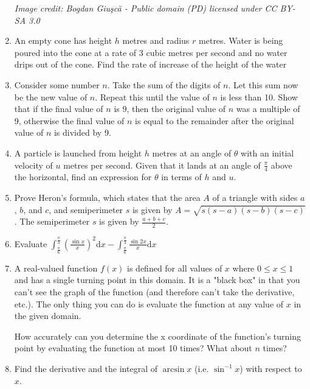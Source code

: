 \documentclass{article}
\begin{document}
\begin{enumerate}
    \textit{Image credit: Bogdan Giuşcă - Public domain (PD) licensed under CC BY-SA 3.0}
    
    \item
    An empty cone has height $h$ metres and radius $r$ metres. Water is being poured into the cone at a rate of 3 cubic metres per second and no water drips out of the cone. Find the rate of increase of the height of the water

    \item
    Consider some number $n$. Take the sum of the digits of $n$. Let this sum now be the new value of $n$. Repeat this until the value of $n$ is less than 10. Show that if the final value of $n$ is 9, then the original value of $n$ was a multiple of 9, otherwise the final value of $n$ is equal to the remainder after the original value of $n$ is divided by 9.
    
    \item
    A particle is launched from height $h$ metres at an angle of $\theta$ with an initial velocity of $u$ metres per second. Given that it lands at an angle of $\frac{\pi}{4}$ above the horizontal, find an expression for $\theta$ in terms of $h$ and $u$.
    
    \item
    Prove Heron's formula, which states that the area $A$ of a triangle with sides $a$, $b$, and $c$, and semiperimeter $s$ is given by $A = \sqrt{s(s-a)(s-b)(s-c)}$. The semiperimeter $s$ is given by $\frac{a+b+c}{2}$.
    
    \item
    Evaluate $\int^{\frac{\pi}{3}}_{\frac{\pi}{6}} (\frac{\sin x}{x})^2 \mathrm{d}x - \int^{\frac{\pi}{3}}_{\frac{\pi}{6}} \frac{\sin 2x}{x} \mathrm{d}x$
    
    \item
    A real-valued function $f(x)$ is defined for all values of $x$ where $0 \leq x \leq 1$ and has a single turning point in this domain. It is a "black box" in that you can't see the graph of the function (and therefore can't take the derivative, etc.). The only thing you can do is evaluate the function at any value of $x$ in the given domain. 
    
    How accurately can you determine the x coordinate of the function's turning point by evaluating the function at most 10 times? What about $n$ times?
    
    
    
    \item
    Find the derivative and the integral of $\arcsin x$ (i.e. $\sin ^{-1} x$) with respect to $x$.
    

\end{enumerate}
\end{document}
